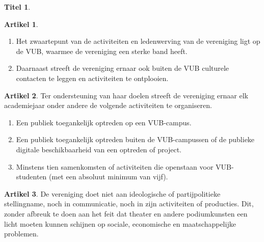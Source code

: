 \documentclass[a4paper,10pt]{article}
\theoremstyle{definition}
\newtheorem{titel}{\newline\Large Titel}
\newtheorem{artikelbase}{\large Artikel}
\newenvironment{artikel}
  {\begin{artikelbase}}
  {\smallskip
   \end{artikelbase}}
\newcommand{\ttextcr}{\hfill\newline}
\newcommand{\ttextenum}{\mbox{}}
\begin{document}
\begin{titel}
  \begin{artikel}\ttextenum
    \begin{enumerate}
      \item
        Het zwaartepunt van de activiteiten en ledenwerving van de vereniging ligt op de VUB, waarmee de vereniging een sterke band heeft.
      \item
        Daarnaast streeft de vereniging ernaar ook buiten de VUB culturele contacten te leggen en activiteiten te ontplooien.
    \end{enumerate}
  \end{artikel}

  \begin{artikel}\ttextcr
    Ter ondersteuning van haar doelen streeft de vereniging ernaar elk academiejaar onder andere de volgende activiteiten te organiseren.
    \begin{enumerate}
      \item Een publiek toegankelijk optreden op een VUB-campus.
      \item Een publiek toegankelijk optreden buiten de VUB-campussen of de publieke digitale beschikbaarheid van een optreden of project.
      \item Minstens tien samenkomsten of activiteiten die openstaan voor VUB-studenten (met een absoluut minimum van vijf).
    \end{enumerate}
  \end{artikel}

  \begin{artikel}\ttextcr
    De vereniging doet niet aan ideologische of partijpolitieke stellingname, noch in communicatie, noch in zijn activiteiten of producties.
    Dit, zonder afbreuk te doen aan het feit dat theater en andere podiumkunsten een licht moeten kunnen schijnen op sociale, economische en maatschappelijke problemen.
  \end{artikel}

\end{titel}

\end{document}
